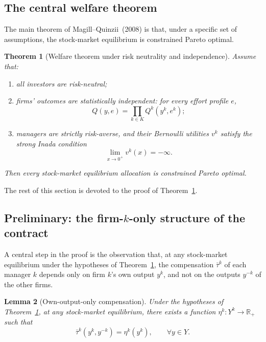 \documentclass[11pt,a4paper,oneside]{book}
\def\R{\mathbb{R}}
\theoremstyle{plain}
\newtheorem{theorem}{Theorem}[chapter]
\newtheorem{lemma}[theorem]{Lemma}
\theoremstyle{definition}
\theoremstyle{remark}
\numberwithin{equation}{chapter}
\begin{document}
\subsection{The central welfare theorem}

The main theorem of Magill--Quinzii~(2008) is that, under a specific set of assumptions, the stock-market equilibrium is constrained Pareto optimal.

\begin{theorem}[Welfare theorem under risk neutrality and independence]\label{thm:MQ08-welfare}
Assume that:
\begin{enumerate}
  \item[\textup{(a)}] \emph{all} investors are risk-neutral;
  \item[\textup{(b)}] firms' outcomes are statistically independent: for every effort profile $e$,
  \begin{equation}\label{eq:independence-MQ08}
    Q(y, e) = \prod_{k \in K} Q^k(y^k, e^k);
  \end{equation}
  \item[\textup{(c)}] managers are strictly risk-averse, and their Bernoulli utilities $v^k$ satisfy the strong Inada condition
  \begin{equation*}
    \lim_{x \to 0^+} v^k(x) = -\infty.
  \end{equation*}
\end{enumerate}
Then every stock-market equilibrium allocation is constrained Pareto optimal.
\end{theorem}

The rest of this section is devoted to the proof of Theorem~\ref{thm:MQ08-welfare}.

\subsection{Preliminary: the firm-$k$-only structure of the contract}

A central step in the proof is the observation that, at any stock-market equilibrium under the hypotheses of Theorem~\ref{thm:MQ08-welfare}, the compensation $\bar{\tau}^k$ of each manager $k$ depends only on firm $k$'s own output $y^k$, and not on the outputs $y^{-k}$ of the other firms.

\begin{lemma}[Own-output-only compensation]\label{lem:own-output}
Under the hypotheses of Theorem~\ref{thm:MQ08-welfare}, at any stock-market equilibrium, there exists a function $\eta^k : Y^k \to \R_+$ such that
\begin{equation*}
  \bar{\tau}^k(y^k, y^{-k}) = \eta^k(y^k),
  \qquad \forall y \in Y.
\end{equation*}
\end{lemma}
\end{document}
